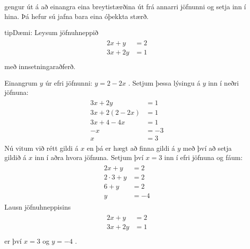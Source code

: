 \documentclass[a4paper,10pt,icelandic]{sphinxmanual}
\begin{document}
\label{\detokenize{Kafli02:s-innsetning}}
 gengur út á að einangra eina breytistærðina út frá annarri jöfnunni og setja inn í hina.
Þá hefur sú jafna bara eina óþekkta stærð.

\begin{sphinxadmonition}{tip}{Dæmi:}
Leysum jöfnuhneppið
\begin{equation*}
\begin{split}\begin{aligned}
  2x+y&=2 \\
  3x+2y&=1 \\
\end{aligned}\end{split}
\end{equation*}
með innsetningaraðferð.


Einangrum \(y\) úr efri jöfnunni: \(y=2-2x\) .
Setjum þessa lýsingu á \(y\) inn í neðri jöfnuna:
\begin{equation*}
\begin{split}\begin{aligned}
  3x+2y&=1 \\
  3x + 2(2-2x) &=1 \\
  3x+4-4x &=1\\
  -x&=-3\\
  x&=3
\end{aligned}\end{split}
\end{equation*}
Nú vitum við rétt gildi á \(x\) en þá er hægt að finna gildi á \(y\) með því að setja gildið á \(x\) inn í aðra hvora jöfnuna.
Setjum því \(x=3\) inn í efri jöfnuna og fáum:
\begin{equation*}
\begin{split}\begin{aligned}
  2x+y&=2 \\
  2\cdot 3 + y &=2 \\
  6+y &=2 \\
  y&=-4
\end{aligned}\end{split}
\end{equation*}
Lausn jöfnuhneppisins
\begin{equation*}
\begin{split}\begin{aligned}
  2x+y&=2 \\
  3x+2y&=1 \\
\end{aligned}\end{split}
\end{equation*}
er því \(x=3\) og \(y=-4\) .
\end{sphinxadmonition}
\end{document}
